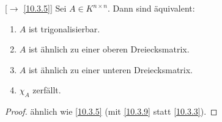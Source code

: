 \documentclass[../../main.tex]{subfiles}
\begin{document}
\begin{sat}\label{10.3.10}
{\rm[$\to$ \ref{10.3.5}]} Sei $A\in K^{n\times n}$. Dann sind äquivalent:
\begin{enumerate}[\rm(a)]
\item $A$ ist trigonalisierbar.
\item $A$ ist ähnlich zu einer oberen Dreiecksmatrix.
\item $A$ ist ähnlich zu einer unteren Dreiecksmatrix.
\item $\chi_A$ zerfällt.
\end{enumerate}
\end{sat}
\begin{proof}
ähnlich wie \ref{10.3.5} (mit \ref{10.3.9} statt \ref{10.3.3}).
\end{proof}

\end{document}
